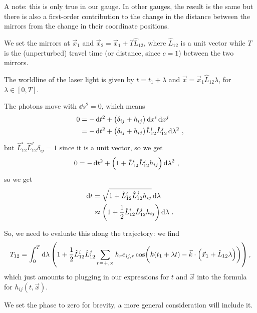 \documentclass[main.tex]{subfiles}
\begin{document}
A note: this is only true in our gauge. In other gauges, the result is the same but there is also a first-order contribution to the change in the distance between the mirrors from the change in their coordinate positions. 

We set the mirrors at \(\vec{x}_{1}\) and \(\vec{x}_{2} = \vec{x}_{1} + T \hat{L}_{12}\), where \(\hat{L}_{12}\) is a unit vector while \(T\) is the (unperturbed) travel time (or distance, since \(c=1\)) between the two mirrors. 

The worldline of the laser light is given by \(t = t_1 + \lambda \) and \(\vec{x} = \vec{x}_{1} \hat{L}_{12} \lambda \), for \(\lambda \in [0,T]\). 

The photons move with \(\dd{s^2} =0\), which means 
%
\begin{subequations}
\begin{align}
0 &= - \dd{t^2} + \qty(\delta_{ij} + h_{ij}) \dd{x^{i}} \dd{x^{j}}  \\
&= - \dd{t^2} + \qty(\delta_{ij} + h_{ij}) \hat{L}_{12}^{i} \hat{L}_{12}^{j} \dd{\lambda^2} 
\,,
\end{align}
\end{subequations}
%
but \(\hat{L}_{12}^{i} \hat{L}_{12}^{j} \delta_{ij} = 1\) since it is a unit vector, so we get 
%
\begin{align}
0 &= - \dd{t^2} + \qty(1 + \hat{L}_{12}^{i} \hat{L}_{12}^{j} h_{ij})  \dd{\lambda^2}
\,,
\end{align}
%
so we get 
%
\begin{subequations}
\begin{align}
\dd{t} &= \sqrt{1 + \hat{L}_{12}^{i} \hat{L}_{12}^{j} h_{ij}} \dd{\lambda }  \\
& \approx \qty(1 + \frac{1}{2} \hat{L}_{12}^{i} \hat{L}_{12}^{j} h_{ij}) \dd{\lambda }
\,.
\end{align}
\end{subequations}

So, we need to evaluate this along the trajectory: we find 
%
\begin{align}
T_{12} = \int_{0}^{T} \dd{\lambda } \qty(1 + \frac{1}{2} \hat{L}_{12}^{i} \hat{L}_{12}^{j} \sum _{r = +, \times } h_{r} e_{ij, r} \cos(k (t_1 + \lambda t) - \vec{k} \cdot \qty(\vec{x}_{1} + \hat{L}_{12} \lambda )))
\,,
\end{align}
%
which just amounts to plugging in our expressions for \(t\) and \(\vec{x}\) into the formula for \(h_{ij} (t, \vec{x})\). 

We set the phase to zero for brevity, a more general consideration will include it. 
\end{document}

